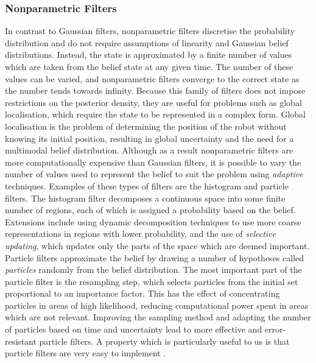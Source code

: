 \documentclass[conference]{IEEEtran}
\begin{document}
\subsubsection{Nonparametric Filters}
In contrast to Gaussian filters, nonparametric filters discretise the probability distribution and do not require assumptions of linearity and Gaussian belief distributions. Instead, the state is approximated by a finite number of values which are taken from the belief state at any given time. The number of these values can be varied, and nonparametric filters converge to the correct state as the number tends towards infinity. Because this family of filters does not impose restrictions on the posterior density, they are useful for problems such as global localisation, which require the state to be represented in a complex form. Global localisation is the problem of determining the position of the robot without knowing its initial position, resulting in global uncertainty and the need for a multimodal belief distribution. Although as a result nonparametric filters are more computationally expensive than Gaussian filters, it is possible to vary the number of values used to represent the belief to suit the problem using \emph{adaptive} techniques. Examples of these types of filters are the histogram and particle filters. The histogram filter decomposes a continuous space into some finite number of regions, each of which is assigned a probability based on the belief. Extensions include using dynamic decomposition techniques to use more coarse representations in regions with lower probability, and the use of \emph{selective updating}, which updates only the parts of the space which are deemed important. Particle filters approximate the belief by drawing a number of hypotheses called \emph{particles} randomly from the belief distribution. The most important part of the particle filter is the resampling step, which selects particles from the initial set proportional to an importance factor. This has the effect of concentrating particles in areas of high likelihood, reducing computational power spent in areas which are not relevant. Improving the sampling method and adapting the number of particles based on time and uncertainty lead to more effective and error-resistant particle filters. A property which is particularly useful to us is that particle filters are very easy to implement \cite{thrun}.
\end{document}

